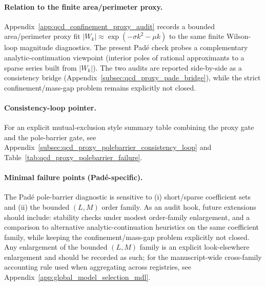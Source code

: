 \paragraph{Relation to the finite area/perimeter proxy.}
\AuditTag Appendix~\ref{app:qcd_confinement_proxy_audit} records a bounded area/perimeter proxy fit $|W_k|\approx \exp(-\sigma k^2-\mu k)$ to the same finite Wilson-loop magnitude diagnostics.
The present Padé check probes a complementary analytic-continuation viewpoint (interior poles of rational approximants to a sparse series built from $|W_k|$).
The two audits are reported side-by-side as a consistency bridge (Appendix~\ref{subsec:qcd_proxy_pade_bridge}), while the strict confinement/mass-gap problem remains explicitly not closed.

\paragraph{Consistency-loop pointer.}
\AuditTag For an explicit mutual-exclusion style summary table combining the proxy gate and the pole-barrier gate, see Appendix~\ref{subsec:qcd_proxy_polebarrier_consistency_loop} and Table~\ref{tab:qcd_proxy_polebarrier_failure}.

\paragraph{Minimal failure points (Pad\'e-specific).}
\AuditTag The Pad\'e pole-barrier diagnostic is sensitive to (i) short/sparse coefficient sets and (ii) the bounded $(L,M)$ order family.
As an audit hook, future extensions should include: stability checks under modest order-family enlargement, and a comparison to alternative analytic-continuation heuristics on the same coefficient family, while keeping the confinement/mass-gap problem explicitly not closed.
\AuditTag Any enlargement of the bounded $(L,M)$ family is an explicit look-elsewhere enlargement and should be recorded as such; for the manuscript-wide cross-family accounting rule used when aggregating across registries, see Appendix~\ref{app:global_model_selection_mdl}.